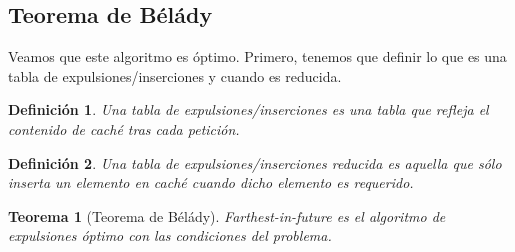 \documentclass[a4paper, 11pt]{article} %
\newtheorem*{mydef}{Definición}
\newtheorem{theorem}{Teorema}
\begin{document}
  \subsection{Teorema de Bélády}
  Veamos que este algoritmo es óptimo.
  Primero, tenemos que definir lo que es una tabla de expulsiones/inserciones y cuando es reducida.


  \begin{mydef}
    Una tabla de expulsiones/inserciones es una tabla que refleja el contenido de caché tras cada petición.
  \end{mydef}
  
  \begin{mydef}
    Una tabla de expulsiones/inserciones reducida es aquella que sólo inserta un elemento en caché cuando dicho elemento es requerido.
  \end{mydef}
  
  \begin{theorem}[Teorema de Bélády]
    Farthest-in-future es el algoritmo de expulsiones óptimo con las condiciones del problema.
  \end{theorem}
\end{document}

